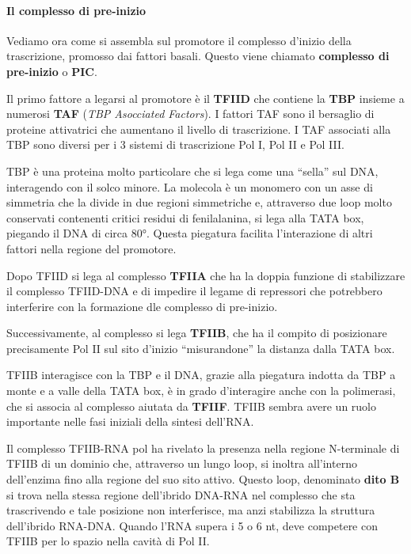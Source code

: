 \documentclass[]{article}
\begin{document}
\paragraph{Il complesso di pre-inizio}\label{il-complesso-di-pre-inizio}

Vediamo ora come si assembla sul promotore il complesso d'inizio della
trascrizione, promosso dai fattori basali. Questo viene chiamato
\textbf{complesso di pre-inizio} o \textbf{PIC}.

Il primo fattore a legarsi al promotore è il \textbf{TFIID} che contiene
la \textbf{TBP} insieme a numerosi \textbf{TAF} (\emph{TBP Asocciated
Factors}). I fattori TAF sono il bersaglio di proteine attivatrici che
aumentano il livello di trascrizione. I TAF associati alla TBP sono
diversi per i 3 sistemi di trascrizione Pol I, Pol II e Pol III.

TBP è una proteina molto particolare che si lega come una ``sella'' sul
DNA, interagendo con il solco minore. La molecola è un monomero con un
asse di simmetria che la divide in due regioni simmetriche e, attraverso
due loop molto conservati contenenti critici residui di fenilalanina, si
lega alla TATA box, piegando il DNA di circa 80°. Questa piegatura
facilita l'interazione di altri fattori nella regione del promotore.

Dopo TFIID si lega al complesso \textbf{TFIIA} che ha la doppia funzione
di stabilizzare il complesso TFIID-DNA e di impedire il legame di
repressori che potrebbero interferire con la formazione dle complesso di
pre-inizio.

Successivamente, al complesso si lega \textbf{TFIIB}, che ha il compito
di posizionare precisamente Pol II sul sito d'inizio ``misurandone'' la
distanza dalla TATA box.

TFIIB interagisce con la TBP e il DNA, grazie alla piegatura indotta da
TBP a monte e a valle della TATA box, è in grado d'interagire anche con
la polimerasi, che si associa al complesso aiutata da \textbf{TFIIF}.
TFIIB sembra avere un ruolo importante nelle fasi iniziali della sintesi
dell'RNA.

Il complesso TFIIB-RNA pol ha rivelato la presenza nella regione
N-terminale di TFIIB di un dominio che, attraverso un lungo loop, si
inoltra all'interno dell'enzima fino alla regione del suo sito attivo.
Questo loop, denominato \textbf{dito B} si trova nella stessa regione
dell'ibrido DNA-RNA nel complesso che sta trascrivendo e tale posizione
non interferisce, ma anzi stabilizza la struttura dell'ibrido RNA-DNA.
Quando l'RNA supera i 5 o 6 nt, deve competere con TFIIB per lo spazio
nella cavità di Pol II.
\end{document}
